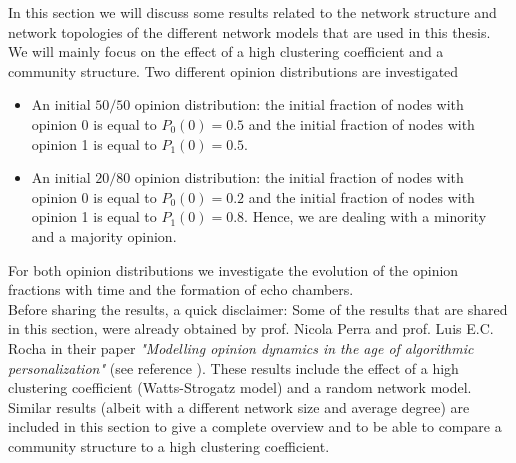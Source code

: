 \documentclass[11 pt , letterpaper , twoside , openright]{book}
\begin{document}
In this section we will discuss some results related to the network structure and network topologies of the different network models that are used in this thesis. We will mainly focus on the effect of a high clustering coefficient and a community structure. Two different opinion distributions are investigated
\begin{itemize}
	\item An initial $50/50$ opinion distribution: the initial fraction of nodes with opinion 0 is equal to $P_0(0) = 0.5$ and the initial fraction of nodes with opinion 1 is equal to $P_1(0) = 0.5$.
	\item An initial $20/80$ opinion distribution: the initial fraction of nodes with opinion 0 is equal to $P_0(0) = 0.2$ and the initial fraction of nodes with opinion 1 is equal to $P_1(0) = 0.8$. Hence, we are dealing with a minority and a majority opinion.
\end{itemize}
For both opinion distributions we investigate the evolution of the opinion fractions with time and the formation of echo chambers.\\
\newline
Before sharing the results, a quick disclaimer: Some of the results that are shared in this section, were already obtained by prof. Nicola Perra and prof. Luis E.C. Rocha in their paper \textit{"Modelling opinion dynamics in the age of algorithmic personalization"} (see reference \cite{Perra2019}). These results include the effect of a high clustering coefficient (Watts-Strogatz model) and a random network model. Similar results (albeit with a different network size and average degree) are included in this section to give a complete overview and to be able to compare a community structure to a high clustering coefficient. 
\end{document}
